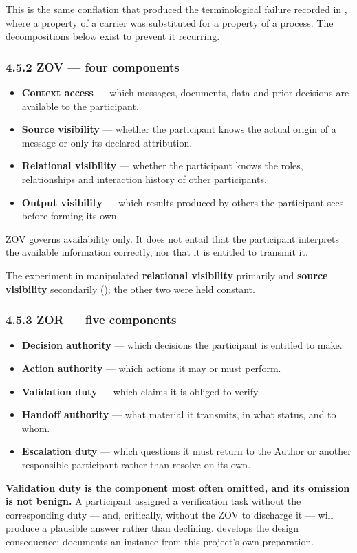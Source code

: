 This is the same conflation that produced the terminological failure recorded in , where a property of a carrier was substituted for a property of a process. The decompositions below exist to prevent it recurring.


\subsubsection*{4.5.2 ZOV — four components}
\label{sec:en:4.5.2}

\begin{itemize}
  \item \textbf{Context access} — which messages, documents, data and prior decisions are available to the participant.
  \item \textbf{Source visibility} — whether the participant knows the actual origin of a message or only its declared attribution.
  \item \textbf{Relational visibility} — whether the participant knows the roles, relationships and interaction history of other participants.
  \item \textbf{Output visibility} — which results produced by others the participant sees before forming its own.
\end{itemize}
ZOV governs availability only. It does not entail that the participant interprets the available information correctly, nor that it is entitled to transmit it.

The experiment in  manipulated \textbf{relational visibility} primarily and \textbf{source visibility} secondarily (); the other two were held constant.


\subsubsection*{4.5.3 ZOR — five components}
\label{sec:en:4.5.3}

\begin{itemize}
  \item \textbf{Decision authority} — which decisions the participant is entitled to make.
  \item \textbf{Action authority} — which actions it may or must perform.
  \item \textbf{Validation duty} — which claims it is obliged to verify.
  \item \textbf{Handoff authority} — what material it transmits, in what status, and to whom.
  \item \textbf{Escalation duty} — which questions it must return to the Author or another responsible participant rather than resolve on its own.
\end{itemize}
\textbf{Validation duty is the component most often omitted, and its omission is not benign.} A participant assigned a verification task without the corresponding duty — and, critically, without the ZOV to discharge it — will produce a plausible answer rather than declining.  develops the design consequence;  documents an instance from this project's own preparation.


